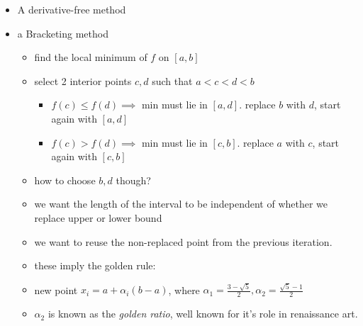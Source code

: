 \documentclass[11pt]{article}
\providecommand{\tightlist}{%
      \setlength{\itemsep}{0pt}\setlength{\parskip}{0pt}}
\begin{document}
\begin{itemize}
\tightlist
\item
  A derivative-free method
\item
  a Bracketing method

  \begin{itemize}
  \tightlist
  \item
    find the local minimum of \(f\) on \([a,b]\)
  \item
    select 2 interior points \(c,d\) such that \(a<c<d<b\)

    \begin{itemize}
    \tightlist
    \item
      \(f(c) \leq f(d) \implies\) min must lie in \([a,d]\). replace
      \(b\) with \(d\), start again with \([a,d]\)
    \item
      \(f(c) > f(d) \implies\) min must lie in \([c,b]\). replace \(a\)
      with \(c\), start again with \([c,b]\)
    \end{itemize}
  \item
    how to choose \(b,d\) though?
  \item
    we want the length of the interval to be independent of whether we
    replace upper or lower bound
  \item
    we want to reuse the non-replaced point from the previous iteration.
  \item
    these imply the golden rule:
  \item
    new point \(x_i = a + \alpha_i (b-a)\), where
    \(\alpha_1 = \frac{3-\sqrt{5}}{2},\alpha_2=\frac{\sqrt{5}-1}{2}\)
  \item
    \(\alpha_2\) is known as the \emph{golden ratio}, well known for
    it's role in renaissance art.
  \end{itemize}
\end{itemize}
\end{document}
